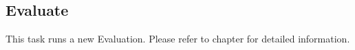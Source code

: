 
\subsection{Evaluate}
\label{sec:ui_proc_evaluate}

This task runs a new Evaluation. Please refer to chapter  for detailed information.
